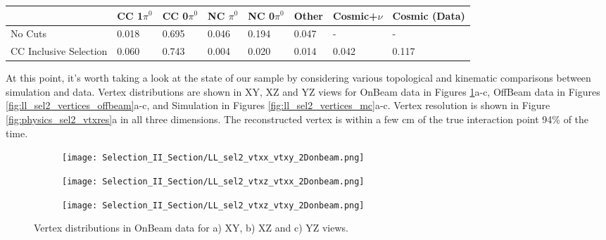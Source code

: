 \begin{table*}
\centering
{}
 \begin{tabular}{| l | l | l |l|l|l|l|l|}
 \hline
 & CC 1$\pi^0$ & CC 0$\pi^0$ & NC $\pi^0$ & NC 0$\pi^0$ & Other & Cosmic+$\nu$ & Cosmic (Data) \\ [0.1ex] \hline
No Cuts & 0.018 & 0.695 & 0.046 & 0.194 & 0.047 & - & -\\ 
CC Inclusive Selection& 0.060 & 0.743 & 0.004 & 0.020 & 0.014 & 0.042 & 0.117 \\ \hline
\end{tabular}
\end{table*}

At this point, it's worth taking a look at the state of our sample by considering various topological and kinematic comparisons between simulation and data.  Vertex distributions are shown in XY, XZ and YZ views for OnBeam data in Figures \ref{fig:ll_sel2_vertices_onbeam}a-c, OffBeam data in Figures \ref{fig:ll_sel2_vertices_offbeam}a-c, and Simulation in Figures \ref{fig:ll_sel2_vertices_mc}a-c.  Vertex resolution is shown in Figure \ref{fig:physics_sel2_vtxres}a in all three dimensions. The reconstructed vertex is within a few cm of the true interaction point 94\% of the time.  

\begin{figure}[h!]
\centering
  \begin{subfigure}[t]{0.26\textwidth}
    \centering
\texttt{[image: Selection\_II\_Section/LL\_sel2\_vtxx\_vtxy\_2Donbeam.png]}
    \caption{ }
  \end{subfigure} 
  \hspace{10 mm}
  \begin{subfigure}[t]{0.26\textwidth}
    \centering
\texttt{[image: Selection\_II\_Section/LL\_sel2\_vtxz\_vtxx\_2Donbeam.png]}
    \caption{ }
  \end{subfigure} 
  \hspace{10 mm}
  \begin{subfigure}[t]{0.26\textwidth}
    \centering
\texttt{[image: Selection\_II\_Section/LL\_sel2\_vtxz\_vtxy\_2Donbeam.png]}
    \caption{ }
  \end{subfigure} 

\caption{ Vertex distributions in OnBeam data for a) XY, b) XZ and c) YZ views. }
\label{fig:ll_sel2_vertices_onbeam}
\end{figure}

